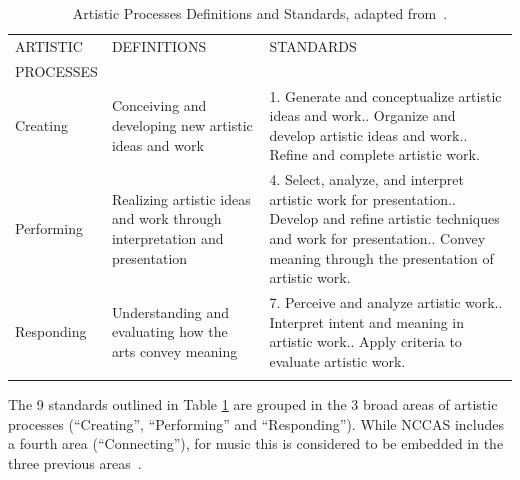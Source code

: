 \documentclass[journal]{IEEEtran}
\begin{document}
\begin{table}[htbp]
	\caption{Artistic Processes Definitions and Standards, adapted from~\cite{NCCAS}.}
	\label{tab:AP}
	\centering
	\begin{tabular}{p{}p{}p{}}\\
		ARTISTIC & DEFINITIONS & STANDARDS\\
		PROCESSES & &\\
		\hline\noalign{\smallskip}
		Creating & Conceiving and developing new artistic ideas and work &1. Generate and conceptualize artistic ideas and work.\newline
		2. Organize and develop artistic ideas and work.\newline
		3. Refine and complete artistic work.\\
		\hline\noalign{\smallskip}
		Performing & Realizing artistic ideas and work through interpretation and presentation & 4. Select, analyze, and interpret artistic work for presentation.\newline
		5. Develop and refine artistic techniques and work for presentation.\newline
		6. Convey meaning through the presentation of artistic work.\\
		\hline\noalign{\smallskip}
		Responding & Understanding and evaluating how the arts convey meaning &
		7. Perceive and analyze artistic work.\newline
		8. Interpret intent and meaning in artistic work.\newline
		9. Apply criteria to evaluate artistic work.\\
		\hline\noalign{\smallskip}
	\end{tabular}
\end{table}

The 9 standards outlined in Table \ref{tab:AP} are grouped in the 3 broad areas of artistic processes (``Creating'', ``Performing'' and ``Responding''). While NCCAS includes a fourth area (``Connecting''), for music this is considered to be embedded in the three previous areas~\cite{NAfme}.
\end{document}
